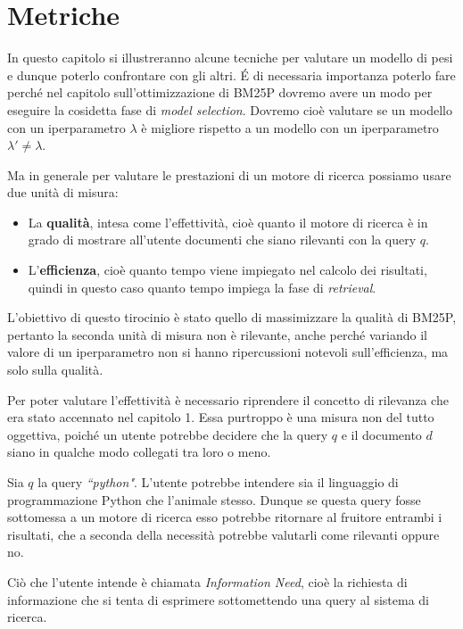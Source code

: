 \chapter{Metriche}

In questo capitolo si  illustreranno alcune tecniche 
per valutare un modello di pesi e dunque poterlo confrontare con gli altri.
\'E di necessaria importanza poterlo fare perché nel capitolo sull'ottimizzazione di BM25P dovremo avere un modo per eseguire
la cosidetta fase di \textit{model selection}. Dovremo cioè valutare se un modello con un iperparametro $\lambda$ è
migliore rispetto a un modello con un iperparametro $\lambda' \neq \lambda$.

Ma in generale per valutare le prestazioni di un motore di ricerca possiamo usare due unità di misura:

\begin{itemize}
	\item La \textbf{qualità}, intesa come l'effettività, cioè quanto il motore di ricerca
	è in grado di mostrare all'utente documenti che siano rilevanti con la query $q$.
	\item L'\textbf{efficienza}, cioè quanto tempo viene impiegato nel calcolo dei risultati, quindi in questo caso
	quanto tempo impiega la fase di \textit{retrieval}.
\end{itemize}

L'obiettivo di questo tirocinio è stato quello di massimizzare la qualità di BM25P, pertanto
la seconda unità di misura non è rilevante, anche perché variando il valore di un iperparametro
non si hanno ripercussioni notevoli sull'efficienza, ma solo sulla qualità.

Per poter valutare l'effettività è necessario riprendere il concetto di rilevanza  che era stato
accennato nel capitolo 1. Essa purtroppo è una misura non del tutto oggettiva,
poiché un utente potrebbe decidere che la query $q$ e il documento $d$ siano
in qualche modo collegati tra loro o meno.

\begin{esempio}
	Sia $q$ la query \textit{``python"}. L'utente potrebbe intendere sia il linguaggio di programmazione Python
	che l'animale stesso. Dunque se questa query fosse sottomessa a un motore di ricerca
	esso potrebbe ritornare al fruitore entrambi i risultati, che a seconda della necessità
	potrebbe valutarli come rilevanti oppure no.
\end{esempio}

Ciò che l'utente intende è chiamata \textit{Information Need}, cioè la richiesta di informazione
che si tenta di esprimere sottomettendo una query al sistema di ricerca.

